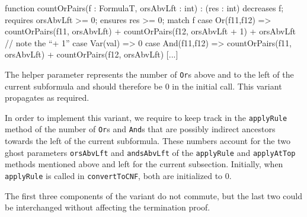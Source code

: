 \begin{dafny}
function countOrPairs(f : FormulaT, orsAbvLft : int) : (res : int)
  decreases f; requires orsAbvLft >= 0; ensures res >= 0;
{ match f {
    case Or(f11,f12) => countOrPairs(f11, orsAbvLft) +
      countOrPairs(f12, orsAbvLft + 1) + orsAbvLft // note the ``+ 1''
    case Var(val) => 0 
    case And(f11,f12) => countOrPairs(f11, orsAbvLft) +
      countOrPairs(f12, orsAbvLft)
    [...] } }
\end{dafny}

The helper parameter represents the number of \texttt{Or}s above and
to the left of the current subformula and should therefore be \( 0 \)
in the initial call. This variant propagates as required.

In order to implement this variant, we require to keep track in the
\texttt{applyRule} method of the number of \texttt{Or}s and
\texttt{And}s that are possibly indirect ancestors towards the left of
the current subformula. These numbers account for the two ghost
parameters \texttt{orsAbvLft} and \texttt{andsAbvLft} of the
\texttt{applyRule} and \texttt{applyAtTop} methods mentioned above and
left for the current subsection. Initially, when \texttt{applyRule} is
called in \texttt{convertToCNF}, both are initialized to \( 0 \).

The first three components of the variant do not commute, but the last
two could be interchanged without affecting the termination proof.
